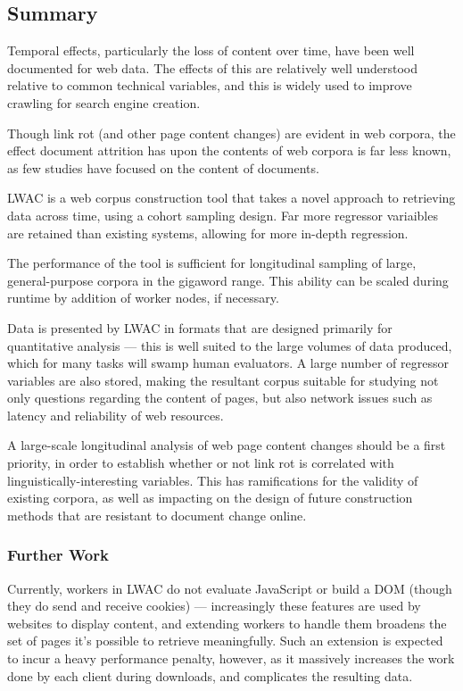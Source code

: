 
\subsection{Summary}

Temporal effects, particularly the loss of content over time, have been well documented for web data.  The effects of this are relatively well understood relative to common technical variables, and this is widely used to improve crawling for search engine creation.

Though link rot (and other page content changes) are evident in web corpora, the effect document attrition has upon the contents of web corpora is far less known, as few studies have focused on the content of documents.

LWAC is a web corpus construction tool that takes a novel approach to retrieving data across time, using a cohort sampling design.  Far more regressor variaibles are retained than existing systems, allowing for more in-depth regression.

The performance of the tool is sufficient for longitudinal sampling of large, general-purpose corpora in the gigaword range.  This ability can be scaled during runtime by addition of worker nodes, if necessary.

Data is presented by LWAC in formats that are designed primarily for quantitative analysis --- this is well suited to the large volumes of data produced, which for many tasks will swamp human evaluators.  A large number of regressor variables are also stored, making the resultant corpus suitable for studying not only questions regarding the content of pages, but also network issues such as latency and reliability of web resources.

A large-scale longitudinal analysis of web page content changes should be a first priority, in order to establish whether or not link rot is correlated with linguistically-interesting variables.  This has ramifications for the validity of existing corpora, as well as impacting on the design of future construction methods that are resistant to document change online.




\subsubsection{Further Work}
Currently, workers in LWAC do not evaluate JavaScript or build a DOM (though they do send and receive cookies) --- increasingly these features are used by websites to display content, and extending workers to handle them broadens the set of pages it's possible to retrieve meaningfully.  Such an extension is expected to incur a heavy performance penalty, however, as it massively increases the work done by each client during downloads, and complicates the resulting data.


